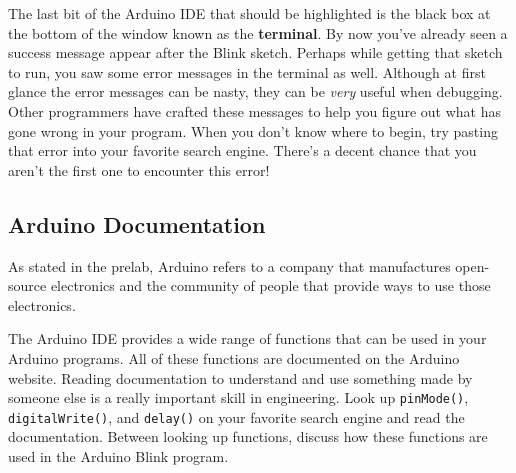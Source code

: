 \documentclass[12pt]{article}
\begin{document}
The last bit of the Arduino IDE that should be highlighted is the
black box at the bottom of the window known as the \textbf{terminal}.
By now you've already seen a success message appear after the Blink
sketch. Perhaps while getting that sketch to run, you saw some error
messages in the terminal as well. Although at first glance the error
messages can be nasty, they can be \textit{very} useful when
debugging. Other programmers have crafted these messages to help you
figure out what has gone wrong in your program. When you don't know
where to begin, try pasting that error into your favorite search
engine. There's a decent chance that you aren't the first one to
encounter this error!

\subsection*{Arduino Documentation}
As stated in the prelab, Arduino refers to a company that manufactures
open-source electronics and the community of people that provide ways
to use those electronics.

The Arduino IDE provides a wide range of functions that can be used in
your Arduino programs. All of these functions are documented on the
Arduino website. Reading documentation to understand and use something
made by someone else is a really important skill in engineering. Look
up \verb|pinMode()|, \verb|digitalWrite()|, and \verb|delay()| on your
favorite search engine and read the documentation. Between looking up
functions, discuss how these functions are used in the Arduino Blink
program.

        
\end{document}
